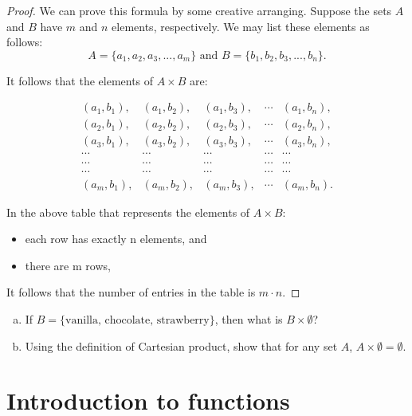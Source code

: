 \begin{proof}
We can prove this formula  by some creative arranging.  Suppose the sets $A$ and $B$ have $m$ and $n$ elements, respectively. We may list these elements as follows: 
\[ A = \{a_1,a_2,a_3,...,a_m\} \mbox{ and } B = \{b_1,b_2,b_3,...,b_n\}. \]
 
It follows that the elements of $A \times B$ are: 

\[ \begin{array}{ccccc}
(a_1, b_1), & (a_1, b_2), & (a_1, b_3), & \cdots & (a_1, b_n), \\
(a_2, b_1), & (a_2, b_2), & (a_2, b_3), & \cdots & (a_2, b_n), \\
(a_3, b_1), & (a_3, b_2), & (a_3, b_3), & \cdots & (a_3, b_n), \\
\cdots & \cdots & \cdots & \cdots & \cdots \\ 
\cdots & \cdots & \cdots & \cdots & \cdots \\ 
\cdots & \cdots & \cdots & \cdots & \cdots \\ 
(a_m, b_1), & (a_m, b_2), & (a_m, b_3), & \cdots & (a_m, b_n). 
\end{array}  \]

In the above table that represents the elements of $A \times B$:
\begin{itemize}
\item 
each row has exactly n elements, and 
\item
there are m rows, 
\end{itemize}

It follows that the number of entries in the table is $m \cdot n$.
\end{proof}

\begin{exercise}{9}
\begin{enumerate}[(a)]
\item
If $B = \{\mbox{vanilla, chocolate, strawberry} \}$, then what is $B \times \emptyset$?
\item
Using the definition of Cartesian product, show that for any set $A$, $A \times \emptyset = \emptyset$.
\end{enumerate}
\end{exercise}



\section{Introduction to functions \quad {}} \label{intro}


